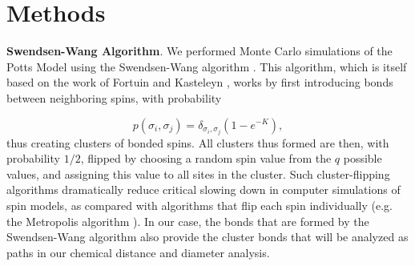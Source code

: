 \documentclass[pre,preprint,11pt]{revtex4}
\begin{document}
\section{Methods}

{\bf Swendsen-Wang Algorithm}.  We performed Monte Carlo simulations of the Potts Model using the Swendsen-Wang algorithm \cite{SwWa}. This algorithm, which is itself based on the work of Fortuin and Kasteleyn \cite{FoKa}, works by first introducing bonds between neighboring spins, with probability 

\begin{equation}
p(\sigma_i,\sigma_j) = \delta_{\sigma_i, \sigma_j} (1-e^{-K}),
\end{equation}  
thus creating clusters of bonded spins.   All clusters thus formed are then, with probability $1/2$, flipped by choosing a random spin value from the $q$ possible values, and assigning this value to all sites in the cluster.  Such cluster-flipping algorithms dramatically reduce critical slowing down in computer simulations of spin models, as compared with algorithms that flip each spin individually \cite{NeBa99} (e.g. the Metropolis algorithm \cite{Met}).  In our case, the  bonds that are formed by the Swendsen-Wang algorithm also provide the cluster bonds that will be analyzed as paths in our chemical distance and diameter analysis.
\end{document}

